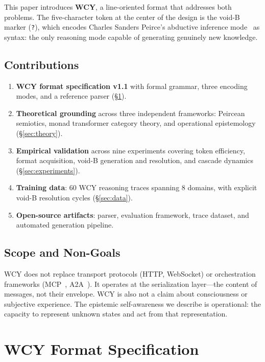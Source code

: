 \documentclass[11pt,a4paper]{article}
\begin{document}
This paper introduces \textbf{WCY}, a line-oriented format that addresses both problems. The five-character token at the center of the design is the void-B marker (\texttt{?}), which encodes Charles Sanders Peirce's abductive inference mode~\citep{peirce1934collected} as syntax: the only reasoning mode capable of generating genuinely new knowledge.

\subsection{Contributions}

\begin{enumerate}[leftmargin=*]
  \item \textbf{WCY format specification v1.1} with formal grammar, three encoding modes, and a reference parser (\S\ref{sec:format}).
  \item \textbf{Theoretical grounding} across three independent frameworks: Peircean semiotics, monad transformer category theory, and operational epistemology (\S\ref{sec:theory}).
  \item \textbf{Empirical validation} across nine experiments covering token efficiency, format acquisition, void-B generation and resolution, and cascade dynamics (\S\ref{sec:experiments}).
  \item \textbf{Training data}: 60 WCY reasoning traces spanning 8 domains, with explicit void-B resolution cycles (\S\ref{sec:data}).
  \item \textbf{Open-source artifacts}: parser, evaluation framework, trace dataset, and automated generation pipeline.
\end{enumerate}

\subsection{Scope and Non-Goals}

WCY does not replace transport protocols (HTTP, WebSocket) or orchestration frameworks (MCP~\citep{anthropic2024mcp}, A2A~\citep{google2025a2a}). It operates at the serialization layer---the content of messages, not their envelope. WCY is also not a claim about consciousness or subjective experience. The epistemic self-awareness we describe is operational: the capacity to represent unknown states and act from that representation.

\section{WCY Format Specification}
\label{sec:format}
\end{document}

